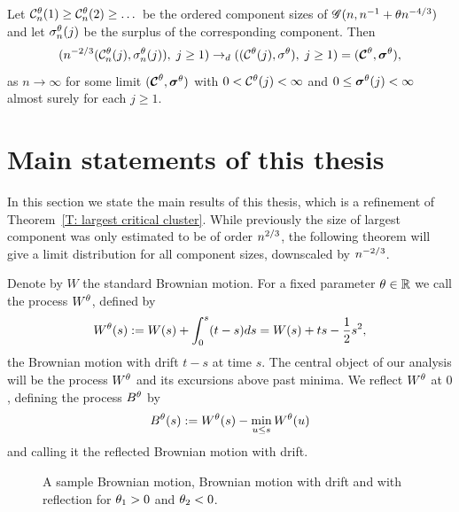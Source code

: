 \begin{folktheorem} \label{T: folk theorem}
	Let $\mathcal{C}^{\theta}_n(1) \geq \mathcal{C}^{\theta}_n(2) \geq \dots$ be the ordered component sizes of
	$\mathscr{G}(n, n^{-1} + \theta n^{-4 / 3})$ and let $\mathcal{\sigma}^{\theta}_n(j)$ be the surplus of the corresponding component.
	Then
	\begin{equation}
		( n^{-2 / 3} ( \mathcal{C}^{\theta}_n(j), \mathcal{\sigma}^{\theta}_n(j) ), \; j \geq 1 ) 
		\rightarrow_d
		( (\mathcal{C}^{\theta}(j), \mathcal{\sigma}^{\theta}), \; j \geq 1 )
		= ( \boldsymbol{\mathcal{C}}^{\theta}, \boldsymbol{\mathcal{\sigma}}^{\theta} ),
	\end{equation}
	as $n \rightarrow \infty$ for some limit $( \boldsymbol{\mathcal{C}}^{\theta}, \boldsymbol{\mathcal{\sigma}}^{\theta} )$
	with $0 < \mathcal{C}^{\theta}(j) < \infty$ and $0 \leq \boldsymbol{\mathcal{\sigma}}^{\theta}(j) < \infty$ almost surely for each $j \geq 1$.
\end{folktheorem}



\section{Main statements of this thesis}

In this section we state the main results of this thesis,
which is a refinement of Theorem~\ref{T: largest critical cluster}.
While previously the size of largest component was only estimated to be of order $n^{2 / 3}$,
the following theorem will give a limit distribution for all component sizes, downscaled by $n^{-2 / 3}$.

Denote by $W$ the standard Brownian motion. 
For a fixed parameter $\theta \in \mathbb{R}$ we call the process $W^{\theta}$, defined by
\begin{equation}
	W^{\theta}(s) := W(s) + \int_{0}^{s}(t-s)ds = W(s) + ts - \frac{1}{2}s^2,
\end{equation}
the Brownian motion with drift $t-s$ at time $s$.
The central object of our analysis will be the process $W^{\theta}$ and its excursions above past minima.
We reflect $W^{\theta}$ at $0$, defining the process $B^{\theta}$ by
\begin{equation}
	B^{\theta}(s) := W^{\theta}(s) - \min_{u \leq s}W^{\theta}(u)
\end{equation}
and calling it the reflected Brownian motion with drift.

\begin{figure}%
	\centering
	\subfloat[$W(s)$]{}%
	\quad
	\subfloat[$W^{\pp_1}(s)$]{}%
	\quad
	\subfloat[$B^{\pp_1}(s)$]{}%
	\quad
	\subfloat[$W^{\pp_2}(s)$]{}%
	\quad
	\subfloat[$B^{\pp_2}(s)$]{}%
	\caption{A sample Brownian motion, Brownian motion with drift and with reflection for $\theta_1>0$ and $\theta_2<0$.}%
	\label{F: BM}%
\end{figure}

